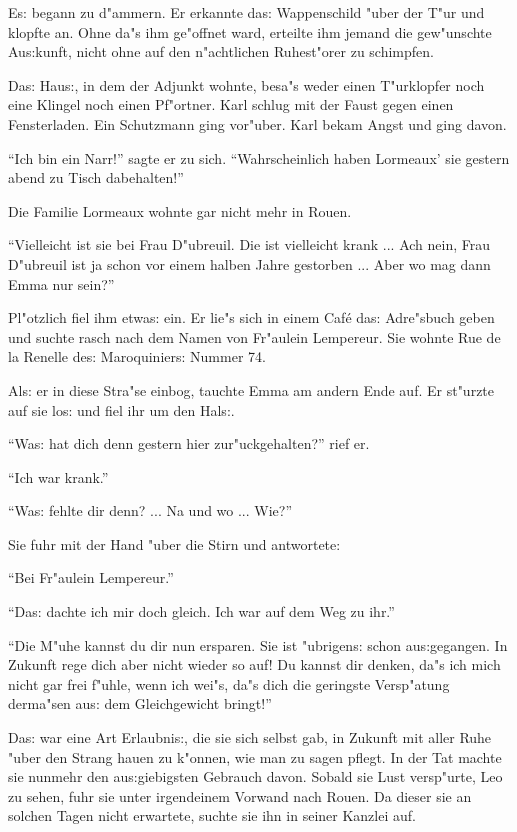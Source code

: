 \documentclass[oneside,12pt]{book}
\newcommand{\s}{s:}%
\begin{document}
E{\s} begann zu d"ammern. Er erkannte da{\s} Wappenschild "uber
der T"ur und klopfte an. Ohne da"s ihm ge"offnet ward, erteilte
ihm jemand die gew"unschte Au{\s}kunft, nicht ohne auf den
n"achtlichen Ruhest"orer zu schimpfen.

Da{\s} Hau{\s}, in dem der Adjunkt wohnte, besa"s weder einen
T"urklopfer noch eine Klingel noch einen Pf"ortner. Karl schlug
mit der Faust gegen einen Fensterladen. Ein Schutzmann ging
vor"uber. Karl bekam Angst und ging davon.

"`Ich bin ein Narr!"' sagte er zu sich. "`Wahrscheinlich haben
Lormeaux' sie gestern abend zu Tisch dabehalten!"'

Die Familie Lormeaux wohnte gar nicht mehr in Rouen.

"`Vielleicht ist sie bei Frau D"ubreuil. Die ist vielleicht krank
... Ach nein, Frau D"ubreuil ist ja schon vor einem halben Jahre
gestorben ... Aber wo mag dann Emma nur sein?"'

Pl"otzlich fiel ihm etwa{\s} ein. Er lie"s sich in einem Caf\'e
da{\s} Adre"sbuch geben und suchte rasch nach dem Namen von
Fr"aulein Lempereur. Sie wohnte Rue de la Renelle de{\s}
Maroquinier{\s} Nummer 74.

Al{\s} er in diese Stra"se einbog, tauchte Emma am andern Ende
auf. Er st"urzte auf sie lo{\s} und fiel ihr um den Hal{\s}.

"`Wa{\s} hat dich denn gestern hier zur"uckgehalten?"' rief er.

"`Ich war krank."'

"`Wa{\s} fehlte dir denn? ... Na und wo ... Wie?"'

Sie fuhr mit der Hand "uber die Stirn und antwortete:

"`Bei Fr"aulein Lempereur."'

"`Da{\s} dachte ich mir doch gleich. Ich war auf dem Weg zu ihr."'

"`Die M"uhe kannst du dir nun ersparen. Sie ist "ubrigen{\s} schon
au{\s}gegangen. In Zukunft rege dich aber nicht wieder so auf! Du
kannst dir denken, da"s ich mich nicht gar frei f"uhle, wenn ich
wei"s, da"s dich die geringste Versp"atung derma"sen au{\s} dem
Gleichgewicht bringt!"'

Da{\s} war eine Art Erlaubni{\s}, die sie sich selbst gab, in
Zukunft mit aller Ruhe "uber den Strang hauen zu k"onnen, wie man
zu sagen pflegt. In der Tat machte sie nunmehr den
au{\s}giebigsten Gebrauch davon. Sobald sie Lust versp"urte, Leo
zu sehen, fuhr sie unter irgendeinem Vorwand nach Rouen. Da dieser
sie an solchen Tagen nicht erwartete, suchte sie ihn in seiner
Kanzlei auf.
\end{document}
